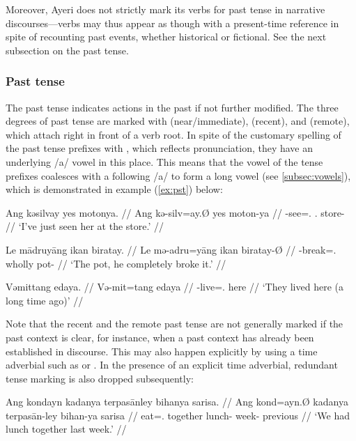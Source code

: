 Moreover, Ayeri does not strictly mark its verbs for past tense in narrative 
discourses---verbs may thus appear as though with a present-time reference in 
spite of recounting past events, whether historical or fictional. See the next 
subsection on the past tense.


\subsubsection{Past tense}
\label{subsubsec:past}
The past tense indicates actions in the past if not further modified. 
The three degrees of past tense are marked with  
(near/immediate),  (recent), and  (remote), which 
attach right in front of a verb root. In spite of the customary spelling of the 
past tense prefixes with , which reflects pronunciation, they have an 
underlying /a/ vowel in this place. This means that the vowel of the tense 
prefixes coalesces with a following /a/ to form a long vowel (see 
\autoref{subsec:vowels}), which is demonstrated in example (\ref{ex:pst}) 
below:

\pex
\a\label{ex:npst}\begingl
	\gla Ang kəsilvay yes motonya. //
	\glb Ang kə-silv=ay.Ø yes moton-ya //
	\glc \AgtT{} \NPst{}-see=\Fsg{}.\Top{} \TsgF{}.\Parg{} store-\Loc{} //
	\glft `I've just seen her at the store.' //
\endgl

\a\label{ex:pst}\begingl
	\gla Le mādruyāng ikan biratay. //
	\glb Le mə-adru=yāng ikan biratay-Ø //
	\glc \PatTI{} \Pst{}-break=\TsgM{}.\Aarg{} wholly pot-\Top{} //
	\glft `The pot, he completely broke it.' //
\endgl

\a\label{ex:rpst}\begingl
	\gla Vəmittang edaya. //
	\glb Və-mit=tang edaya //
	\glc \RPst{}-live=\TplM{}.\Aarg{} here //
	\glft `They lived here (a long time ago)' //
\endgl

\xe

Note that the recent and the remote past tense are not generally marked if the 
past context is clear, for instance, when a past context has already been 
established in discourse. This may also happen explicitly by using a time 
adverbial such as  or . In the presence of an 
explicit time adverbial, redundant tense marking is also dropped subsequently:

\ex\begingl
	\gla Ang kondayn kadanya terpasānley bihanya sarisa. //
	\glb Ang kond=ayn.Ø kadanya terpasān-ley bihan-ya sarisa //
	\glc \AgtT{} eat=\Fpl{}.\Top{} together lunch-\PargI{} week-\Loc{}
		previous //
	\glft `We had lunch together last week.' //
\endgl\xe

